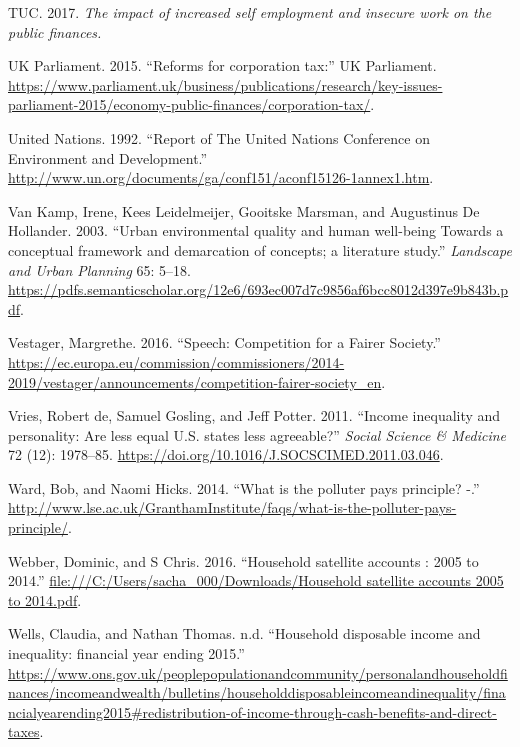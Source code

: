 \documentclass[]{tufte-handout}
\begin{document}
\leavevmode\hypertarget{ref-TUC2017}{}%
TUC. 2017. \emph{The impact of increased self employment and insecure
work on the public finances.}

\leavevmode\hypertarget{ref-UKParliament2015}{}%
UK Parliament. 2015. ``Reforms for corporation tax:'' UK Parliament.
\url{https://www.parliament.uk/business/publications/research/key-issues-parliament-2015/economy-public-finances/corporation-tax/}.

\leavevmode\hypertarget{ref-UnitedNations1992}{}%
United Nations. 1992. ``Report of The United Nations Conference on
Environment and Development.''
\url{http://www.un.org/documents/ga/conf151/aconf15126-1annex1.htm}.

\leavevmode\hypertarget{ref-VanKamp2003}{}%
Van Kamp, Irene, Kees Leidelmeijer, Gooitske Marsman, and Augustinus De
Hollander. 2003. ``Urban environmental quality and human well-being
Towards a conceptual framework and demarcation of concepts; a literature
study.'' \emph{Landscape and Urban Planning} 65: 5--18.
\url{https://pdfs.semanticscholar.org/12e6/693ec007d7c9856af6bcc8012d397e9b843b.pdf}.

\leavevmode\hypertarget{ref-Vestager2016}{}%
Vestager, Margrethe. 2016. ``Speech: Competition for a Fairer Society.''
\url{https://ec.europa.eu/commission/commissioners/2014-2019/vestager/announcements/competition-fairer-society_en}.

\leavevmode\hypertarget{ref-DeVries2011}{}%
Vries, Robert de, Samuel Gosling, and Jeff Potter. 2011. ``Income
inequality and personality: Are less equal U.S. states less agreeable?''
\emph{Social Science \& Medicine} 72 (12): 1978--85.
\url{https://doi.org/10.1016/J.SOCSCIMED.2011.03.046}.

\leavevmode\hypertarget{ref-GranthamResearchInstituteonclimatechangeandtheenvironment2014}{}%
Ward, Bob, and Naomi Hicks. 2014. ``What is the polluter pays principle?
-.''
\url{http://www.lse.ac.uk/GranthamInstitute/faqs/what-is-the-polluter-pays-principle/}.

\leavevmode\hypertarget{ref-Webber2016}{}%
Webber, Dominic, and S Chris. 2016. ``Household satellite accounts :
2005 to 2014.''
\href{file:///C:/Users/sacha_000/Downloads/Household\%20satellite\%20accounts\%202005\%20to\%202014.pdf}{file:///C:/Users/sacha\_000/Downloads/Household satellite accounts 2005 to 2014.pdf}.

\leavevmode\hypertarget{ref-Wells}{}%
Wells, Claudia, and Nathan Thomas. n.d. ``Household disposable income
and inequality: financial year ending 2015.''
\url{https://www.ons.gov.uk/peoplepopulationandcommunity/personalandhouseholdfinances/incomeandwealth/bulletins/householddisposableincomeandinequality/financialyearending2015\#redistribution-of-income-through-cash-benefits-and-direct-taxes}.
\end{document}
